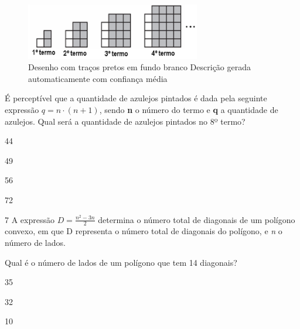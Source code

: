 {{{\begin{escolha}
{{{{{\begin{escolha}
\begin{escolha}
{\begin{q°}
{\begin{escolha}
\begin{escolha}
\begin{escolha}
\begin{escolha}
\begin{escolha}
\begin{escolha}
{{\begin{figure}
\centering
\includegraphics[width=3in,height=0.96526in]{./_SAEB_9_MAT/media/image270.png}
\caption{Desenho com traços pretos em fundo branco Descrição gerada
automaticamente com confiança média}
\end{figure}


É perceptível que a quantidade de azulejos pintados é dada pela
seguinte expressão $q = n \cdot (n + 1)$, sendo \textbf{n} o número do termo 
e \textbf{q} a quantidade de azulejos. Qual será a quantidade de azulejos
pintados no 8º termo?

\begin{escolha}

\item 44

\item 49

\item 56

\item 72

\end{escolha}


\num{7} A expressão $D = \frac{n^2 - 3n}{2}$ determina o número total de 
diagonais de um polígono convexo, em que D representa o número total de
diagonais do polígono, e \emph{n} o número de lados.

Qual é o número de lados de um polígono que tem 14 diagonais?

\begin{escolha}

  \item 35

  \item 32

  \item 10


\end{escolha}}}
\end{escolha}
\end{escolha}
\end{escolha}
\end{escolha}
\end{escolha}
\end{escolha}}
\end{q°}}
\end{escolha}
\end{escolha}}}}}}
\end{escolha}}}}
